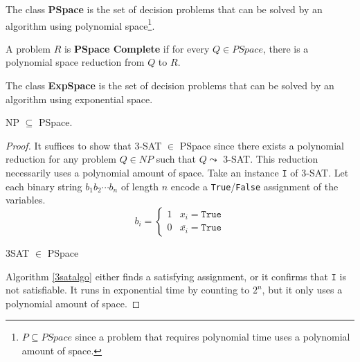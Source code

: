  	\begin{defn}[PSpace]
 		The class \textbf{PSpace} is the set of decision problems that can be solved by an algorithm using polynomial space\footnote{$P \subseteq PSpace$ since a problem that requires polynomial time uses a polynomial amount of space.}.
 	\end{defn}

 	\begin{defn}
 		A problem $R$ is \textbf{PSpace Complete} if for every $Q \in PSpace$, there is a polynomial space reduction from $Q$ to $R$.
 	\end{defn}

 	 \begin{defn}[ExpSpace]
 		The class \textbf{ExpSpace} is the set of decision problems that can be solved by an algorithm using exponential space.
 	\end{defn}

 	\begin{thm}
 		NP $\subseteq$ PSpace.
 	\end{thm}

 	\begin{proof}
 		\noindent It suffices to show that 3-SAT $\in$ PSpace since there exists a polynomial reduction for any problem $Q \in NP$ such that $Q \leadsto$ 3-SAT. This reduction necessarily uses a polynomial amount of space. Take an instance \texttt{I} of 3-SAT. Let each binary string $b_1b_2 \cdots b_n$ of length $n$ encode a \texttt{True}/\texttt{False} assignment of the variables.
 		\[b_i = \begin{cases}
 			1 & x_i = \texttt{True} \\
 			0 & \bar{x_i} = \texttt{True}
 		\end{cases}\]

 		\begin{algorithm}
	  \caption{3SAT $\in$ PSpace}\label{3Sat}
	\label{3satalgo}
	\end{algorithm}

 	\noindent Algorithm \ref{3satalgo} either finds a satisfying assignment, or it confirms that $\texttt{I}$ is not satisfiable. It runs in exponential time by counting to $2^n$, but it only uses a polynomial amount of space.
 	\end{proof}

